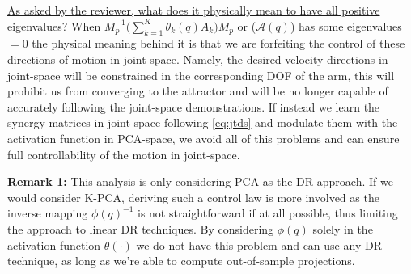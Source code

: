 \documentclass{article}
\begin{document}
\begin{enumerate}
\underline{As asked by the reviewer, what does it physically mean to have all positive eigenvalues?}  When $M_p^{-1}\big(\sum_{k=1}^{K}\theta_k(q)A_k\big)M_p$  or ($\mathcal{A}(q)$) has some eigenvalues $=0$ the physical meaning behind it is that we are forfeiting the control of these directions of motion in joint-space. Namely, the desired velocity directions in joint-space will be constrained in the corresponding DOF of the arm, this will prohibit us from converging to the attractor and will be no longer capable of accurately following the joint-space demonstrations.  If instead we learn the synergy matrices in joint-space following \eqref{eq:jtds} and modulate them with the activation function in PCA-space, we avoid all of this problems and can ensure full controllability of the motion in joint-space. 

\noindent \textbf{Remark 1:} This analysis is only considering PCA as the DR approach. If we would consider K-PCA, deriving such a control law is more involved as the inverse mapping $\phi(q)^{-1}$ is not straightforward if at all possible, thus limiting the approach to linear DR techniques. By considering $\phi(q)$ solely in the activation function $\theta(\cdot)$ we do not have this problem and can use any DR technique, as long as we're able to compute out-of-sample projections.


\end{enumerate}
\end{document}
